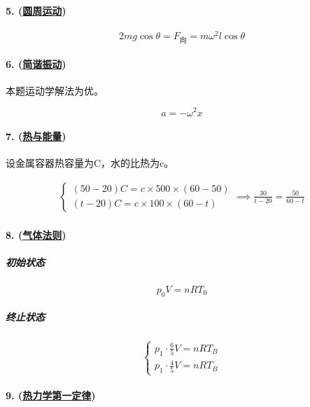 \paragraph{5. (\hyperref[subsec:圆周运动]{圆周运动})}

\begin{equation*}
    2mg\cos\theta=F_\textrm{向}=m\omega^2l\cos\theta
\end{equation*}

\paragraph{6. (\hyperref[subsec:简谐振动]{简谐振动})} 本题运动学解法为优。

\begin{equation*}
    a=-\omega^2x
\end{equation*}

\paragraph{7. (\hyperref[sec:热与能量]{热与能量})} 设金属容器热容量为C，水的比热为c。

\begin{gather*}
    \begin{cases}
        (50-20)C=c\times500\times(60-50)\\
        (t-20)C=c\times100\times(60-t)
    \end{cases}\implies
    \frac{30}{t-20}=\frac{50}{60-t}
\end{gather*}

\paragraph{8. (\hyperref[subsec:气体法则]{气体法则})}

\subparagraph{初始状态}

\begin{equation*}
    p_0V=nRT_0
\end{equation*}

\subparagraph{终止状态}

\begin{equation*}
    \begin{cases}
        p_1\cdot\frac65V=nRT_B\\
        p_1\cdot\frac45V=nRT_B
    \end{cases}
\end{equation*}

\paragraph{9. (\hyperref[subsec:热力学第一定律]{热力学第一定律})}

